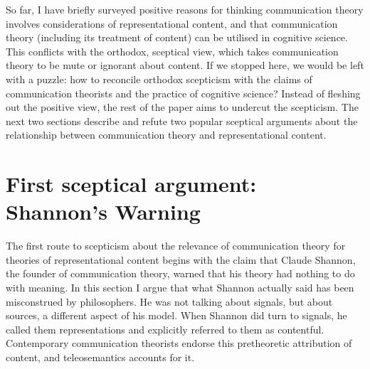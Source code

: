 \documentclass[12pt]{article}
\begin{document}


So far, I have briefly surveyed positive reasons for thinking communication theory involves considerations of representational content, and that communication theory (including its treatment of content) can be utilised in cognitive science.
This conflicts with the orthodox, sceptical view, which takes communication theory to be mute or ignorant about content.
If we stopped here, we would be left with a puzzle: how to reconcile orthodox scepticism with the claims of communication theorists and the practice of cognitive science?
Instead of fleshing out the positive view, the rest of the paper aims to undercut the scepticism.
The next two sections describe and refute two popular sceptical arguments about the relationship between communication theory and representational content.



\section{First sceptical argument: Shannon's Warning}\label{sec:warning}

The first route to scepticism about the relevance of communication theory for theories of representational content begins with the claim that Claude Shannon, the founder of communication theory, warned that his theory had nothing to do with meaning.
In this section I argue that what Shannon actually said has been misconstrued by philosophers.
He was not talking about signals, but about sources, a different aspect of his model.
When Shannon did turn to signals, he called them representations and explicitly referred to them as contentful.
Contemporary communication theorists endorse this pretheoretic attribution of content, and teleosemantics accounts for it.
\end{document}
